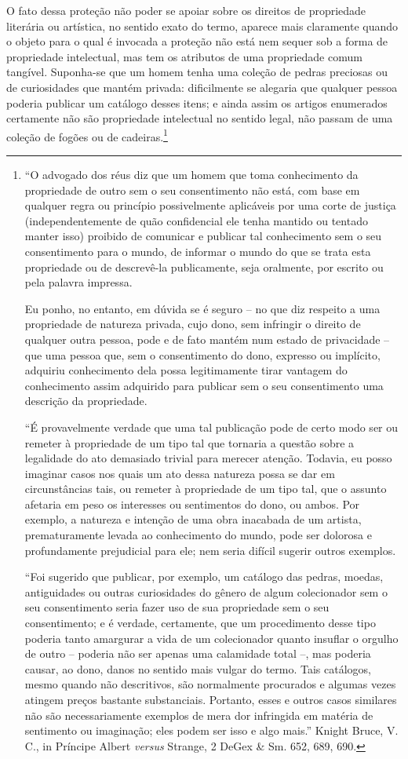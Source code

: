 O fato dessa proteção não poder se apoiar sobre os direitos de
propriedade literária ou artística, no sentido exato do termo, aparece
mais claramente quando o objeto para o qual é invocada a proteção não
está nem sequer sob a forma de propriedade intelectual, mas tem os
atributos de uma propriedade comum tangível. Suponha-se que um homem
tenha uma coleção de pedras preciosas ou de curiosidades que mantém
privada: dificilmente se alegaria que qualquer pessoa poderia publicar
um catálogo desses itens; e ainda assim os artigos enumerados certamente
não são propriedade intelectual no sentido legal, não passam de uma
coleção de fogões ou de cadeiras.\footnote{``O advogado dos réus diz que
  um homem que toma conhecimento da propriedade de outro sem o seu
  consentimento não está, com base em qualquer regra ou princípio
  possivelmente aplicáveis por uma corte de justiça (independentemente
  de quão confidencial ele tenha mantido ou tentado manter isso)
  proibido de comunicar e publicar tal conhecimento sem o seu
  consentimento para o mundo, de informar o mundo do que se trata esta
  propriedade ou de descrevê-la publicamente, seja oralmente, por
  escrito ou pela palavra impressa.

  Eu ponho, no entanto, em dúvida se é seguro -- no que diz respeito a
  uma propriedade de natureza privada, cujo dono, sem infringir o
  direito de qualquer outra pessoa, pode e de fato mantém num estado de
  privacidade -- que uma pessoa que, sem o consentimento do dono,
  expresso ou implícito, adquiriu conhecimento dela possa legitimamente
  tirar vantagem do conhecimento assim adquirido para publicar sem o seu
  consentimento uma descrição da propriedade.

  ``É provavelmente verdade que uma tal publicação pode de certo modo
  ser ou remeter à propriedade de um tipo tal que tornaria a questão
  sobre a legalidade do ato demasiado trivial para merecer atenção.
  Todavia, eu posso imaginar casos nos quais um ato dessa natureza possa
  se dar em circunstâncias tais, ou remeter à propriedade de um tipo
  tal, que o assunto afetaria em peso os interesses ou sentimentos do
  dono, ou ambos. Por exemplo, a natureza e intenção de uma obra
  inacabada de um artista, prematuramente levada ao conhecimento do
  mundo, pode ser dolorosa e profundamente prejudicial para ele; nem
  seria difícil sugerir outros exemplos.

  ``Foi sugerido que publicar, por exemplo, um catálogo das pedras,
  moedas, antiguidades ou outras curiosidades do gênero de algum
  colecionador sem o seu consentimento seria fazer uso de sua
  propriedade sem o seu consentimento; e é verdade, certamente, que um
  procedimento desse tipo poderia tanto amargurar a vida de um
  colecionador quanto insuflar o orgulho de outro -- poderia não ser
  apenas uma calamidade total --, mas poderia causar, ao dono, danos no
  sentido mais vulgar do termo. Tais catálogos, mesmo quando não
  descritivos, são normalmente procurados e algumas vezes atingem preços
  bastante substanciais. Portanto, esses e outros casos similares não
  são necessariamente exemplos de mera dor infringida em matéria de
  sentimento ou imaginação; eles podem ser isso e algo mais.'' Knight
  Bruce, V. C., in Príncipe Albert \emph{versus} Strange, 2 DeGex \& Sm.
  652, 689, 690.}


